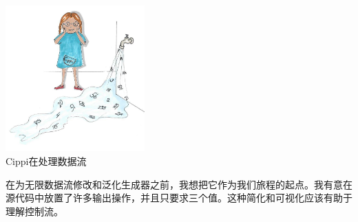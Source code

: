 \begin{center}
\includegraphics[width=0.4\textwidth]{content/3/chapter7/images/13.png}\\
Cippi在处理数据流
\end{center}

在为无限数据流修改和泛化生成器之前，我想把它作为我们旅程的起点。我有意在源代码中放置了许多输出操作，并且只要求三个值。这种简化和可视化应该有助于理解控制流。

